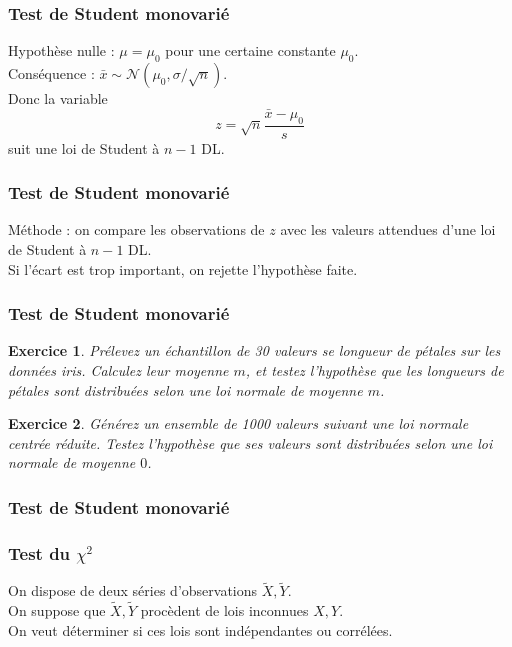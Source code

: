 \documentclass[11pt]{beamer}
\newenvironment{slide}[1]{%
\begin{frame}[environment=slide]
\frametitle{#1}
}{%
\end{frame}
}
\newtheorem{exercice}{Exercice}
\newcommand{\Python}[1]{
	{\small	}
}
\begin{document}
\begin{slide}{Test de Student monovarié}
Hypothèse nulle : $\mu = \mu_0$ pour une certaine constante $\mu_0$.\\
\pause
\vspace{0.2cm}Conséquence : $\bar{x}\sim \mathcal{N}(\mu_0,\sigma/\sqrt{n})$.\\
\pause
\vspace{0.2cm}Donc la variable 
$$z=\sqrt{n}\frac{\bar{x}-\mu_0}{s}$$
suit une loi de Student à $n-1$ DL.

\end{slide}

\begin{slide}{Test de Student monovarié}
Méthode : on compare les observations de $z$ avec les valeurs attendues d'une loi de Student à $n-1$ DL.\\
\pause
\vspace{0.2cm} Si l'écart est trop important, on rejette l'hypothèse faite.
\end{slide}

\begin{slide}{Test de Student monovarié}
\begin{exercice}
Prélevez un échantillon de 30 valeurs se longueur de pétales sur les données iris. Calculez leur moyenne $m$, et testez l'hypothèse que les longueurs de pétales sont distribuées selon une loi normale de moyenne $m$.
\end{exercice}
\begin{exercice}
Générez un ensemble de 1000 valeurs suivant une loi normale centrée réduite. Testez l'hypothèse que ses valeurs sont distribuées selon une loi normale de moyenne $0$.
\end{exercice}
\end{slide}

\begin{slide}{Test de Student monovarié}

\Python{ex901}
\end{slide}


\begin{slide}{Test du $\chi^2$}
On dispose de deux séries d'observations $\tilde{X},\tilde{Y}$.\\
\pause
\vspace{0.2cm}On suppose que $\tilde{X},\tilde{Y}$ procèdent de lois inconnues $X,Y$.\\
\pause
\vspace{0.2cm}On veut déterminer si ces lois sont indépendantes ou corrélées. 

\end{slide}
\end{document}
